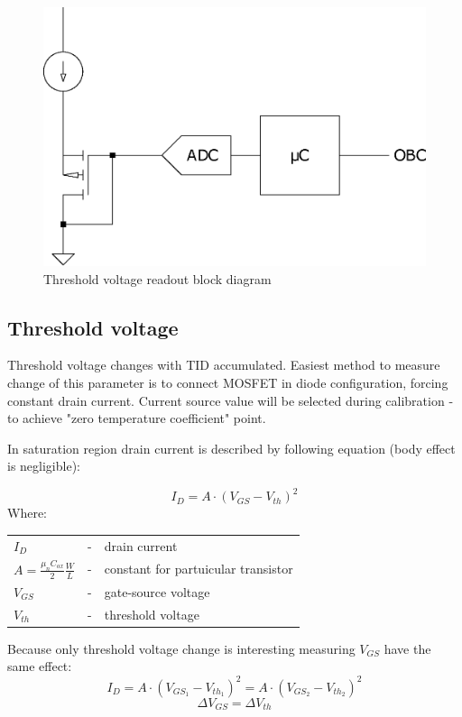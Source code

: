     \begin{figure}[H]
        \centering
        \includegraphics[width=0.3\paperwidth]{img/conceptual_block_diagram.eps}
        \caption{Threshold voltage readout block diagram}
    \end{figure}

    \subsection{Threshold voltage}
        Threshold voltage changes with TID accumulated. Easiest method to measure change of this parameter is to connect MOSFET in diode configuration, forcing constant drain current. Current source value will be selected during calibration - to achieve "zero temperature coefficient" point.

        In saturation region drain current is described by following equation (body effect is negligible):

        $$I_D = A \cdot (V_{GS} - V_{th})^2$$
        Where:

        \begin{tabular}{lcl}
            $I_D$ & - & drain current \\
            $A = \frac{\mu_n C_{ox}}{2} \frac{W}{L}$ & - & constant for partuicular transistor \\
            $V_{GS}$ & - & gate-source voltage \\
            $V_{th}$ & - & threshold voltage \\
        \end{tabular}
        \bigskip

        Because only threshold voltage change is interesting measuring $V_{GS}$ have the same effect:
        $$I_D = A \cdot (V_{GS_1} - V_{th_1})^2 = A \cdot (V_{GS_2} - V_{th_2})^2$$
        $$\Delta V_{GS} = \Delta V_{th}$$


